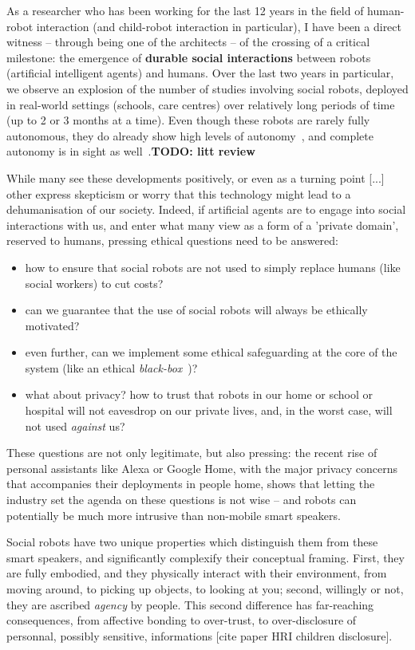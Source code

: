 \documentclass[11pt]{report}
\newcommand{\TODO}[1]{{\color{red}\textbf{TODO: #1}}}
\begin{document}
As a researcher who has been working for the last 12 years in the field of
human-robot interaction (and child-robot interaction in particular), I have been
a direct witness -- through being one of the architects -- of the crossing of a
critical milestone: the emergence of \textbf{durable social interactions}
between robots (artificial intelligent agents) and humans. Over the last two
years in particular, we observe an explosion of the number of studies involving
social robots, deployed in real-world settings (schools, care centres) over
relatively long periods of time (up to 2 or 3 months at a time). Even though
these robots are rarely fully autonomous, they do already show high levels of
autonomy~\cite{emmanuel}, and complete autonomy is in sight as
well~\cite{strands}.\TODO{litt review}

While many see these developments positively, or even as a turning point [...]
other express skepticism or worry that this technology might lead to a
dehumanisation of our society. Indeed, if artificial agents are to engage into
social interactions with us, and enter what many view as a form of a 'private
domain', reserved to humans, pressing ethical questions need to be answered:

\begin{itemize}
    \item how to ensure that social robots are not used to simply replace humans
        (like social workers) to cut costs?
    \item can we guarantee that the use of social robots will always be ethically motivated?
    \item even further, can we implement some ethical safeguarding at the core
        of the system (like an ethical \emph{black-box}~\cite{winfield})?
    \item what about privacy? how to trust that robots in our home or school or
        hospital will not eavesdrop on our private lives, and, in the worst
        case, will not used \emph{against} us?
\end{itemize}

These questions are not only legitimate, but also pressing: the recent rise of
personal assistants like Alexa or Google Home, with the major privacy concerns
that accompanies their deployments in people home, shows that letting the
industry set the agenda on these questions is not wise -- and robots can
potentially be much more intrusive than non-mobile smart speakers.

Social robots have two unique properties which distinguish them from these smart
speakers, and significantly complexify their conceptual framing. First, they are
fully embodied, and they physically interact with their environment, from moving
around, to picking up objects, to looking at you; second, willingly or not, they
are ascribed \emph{agency} by people.  This second difference has far-reaching
consequences, from affective bonding to over-trust, to over-disclosure of
personnal, possibly sensitive, informations [cite paper HRI children
disclosure].
\end{document}
